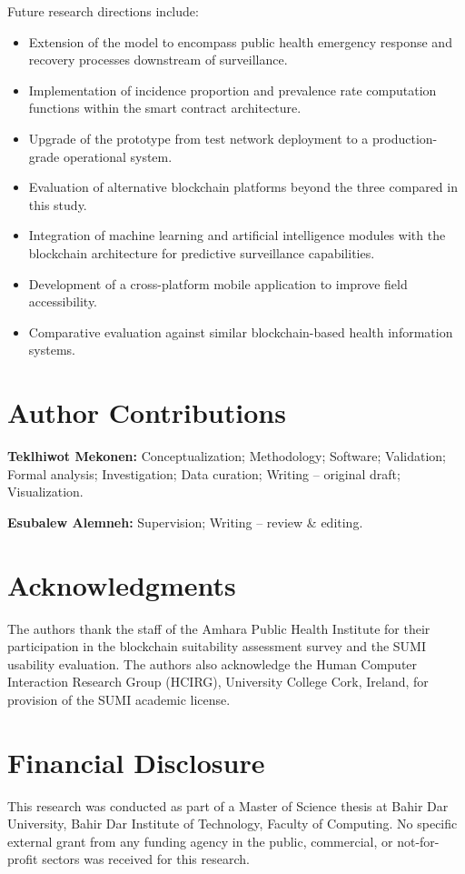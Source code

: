 \documentclass[AMA,LATO1COL]{WileyNJD-v2}
\begin{document}
Future research directions include:
\begin{itemize}
\item Extension of the model to encompass public health emergency response and recovery processes downstream of surveillance.
\item Implementation of incidence proportion and prevalence rate computation functions within the smart contract architecture.
\item Upgrade of the prototype from test network deployment to a production-grade operational system.
\item Evaluation of alternative blockchain platforms beyond the three compared in this study.
\item Integration of machine learning and artificial intelligence modules with the blockchain architecture for predictive surveillance capabilities.
\item Development of a cross-platform mobile application to improve field accessibility.
\item Comparative evaluation against similar blockchain-based health information systems.
\end{itemize}


\section*{Author Contributions}
\textbf{Teklhiwot Mekonen:} Conceptualization; Methodology; Software; Validation; Formal analysis; Investigation; Data curation; Writing -- original draft; Visualization.

\textbf{Esubalew Alemneh:} Supervision; Writing -- review \& editing.

\section*{Acknowledgments}
The authors thank the staff of the Amhara Public Health Institute for their participation in the blockchain suitability assessment survey and the SUMI usability evaluation. The authors also acknowledge the Human Computer Interaction Research Group (HCIRG), University College Cork, Ireland, for provision of the SUMI academic license.

\section*{Financial Disclosure}
This research was conducted as part of a Master of Science thesis at Bahir Dar University, Bahir Dar Institute of Technology, Faculty of Computing. No specific external grant from any funding agency in the public, commercial, or not-for-profit sectors was received for this research.
\end{document}
